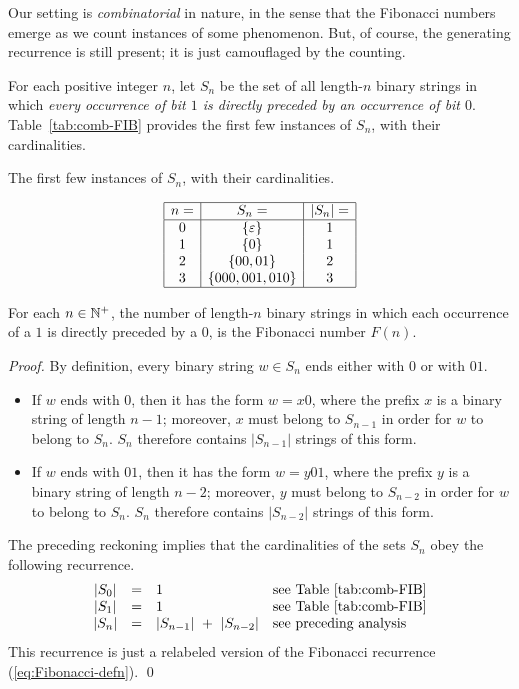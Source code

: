 \medskip

Our setting is {\em combinatorial} in nature, in the sense that the Fibonacci numbers emerge as we count instances of some phenomenon. But, of course, the generating recurrence is still present; it is just camouflaged by the counting.

\bigskip

For each positive integer $n$, let $S_n$ be the set of all length-$n$ binary strings in which {\em every occurrence of bit $1$ is directly preceded by an occurrence of bit $0$}.  Table~\ref{tab:comb-FIB} provides the first few instances of $S_n$, with their cardinalities.
\begin{table}[hbt]
\label{tab:comb-FIB}
\caption{The first few instances of $S_n$, with their cardinalities.}
\[
\begin{array}{|c|c|c|}
\hline
n = & S_n =               & |S_n| = \\
\hline
0   & \{ \varepsilon\}    & 1 \\ 
1   & \{ 0 \}             & 1 \\
2   & \{ 00, 01 \}        & 2 \\
3   & \{ 000, 001, 010 \} & 3 \\
\hline
\end{array}
\]
\end{table}


\begin{prop}
\label{thm:FIBO-from-sparse-bitstrings}
For each $n \in \mathbb{N}^+$, the number of length-$n$ binary strings in which each occurrence of a $1$ is directly preceded by a $0$, is the Fibonacci number $F(n)$.
\end{prop}

\begin{proof}
By definition, every binary string $w \in S_n$ ends either with $0$ or with $01$.
\begin{itemize}
\item
If $w$ ends with $0$, then it has the form $w = x0$, where the prefix $x$ is a binary string of length $n-1$; moreover, $x$ must belong to $S_{n-1}$ in order for $w$ to belong to $S_n$.  $S_n$ therefore contains $|S_{n-1}|$ strings of this form.

\item
If $w$ ends with $01$, then it has the form $w = y01$, where the prefix $y$ is a binary string of length $n-2$; moreover, $y$ must belong to $S_{n-2}$ in order for $w$ to belong to $S_n$.  $S_n$ therefore contains $|S_{n-2}|$ strings of this form.
\end{itemize}

The preceding reckoning implies that the cardinalities of the sets $S_n$ obey the following recurrence.
\[
\begin{array}{ccll}
|S_0| & = & 1 & \mbox{see Table~\ref{tab:comb-FIB}} \\
|S_1| & = & 1 & \mbox{see Table~\ref{tab:comb-FIB}} \\
|S_n| & = & |S_{n-1}| \ + \ |S_{n-2}| & \mbox{see preceding analysis}
\end{array}
\]
This recurrence is just a relabeled version of the Fibonacci recurrence (\ref{eq:Fibonacci-defn}).  \qed
\end{proof}



